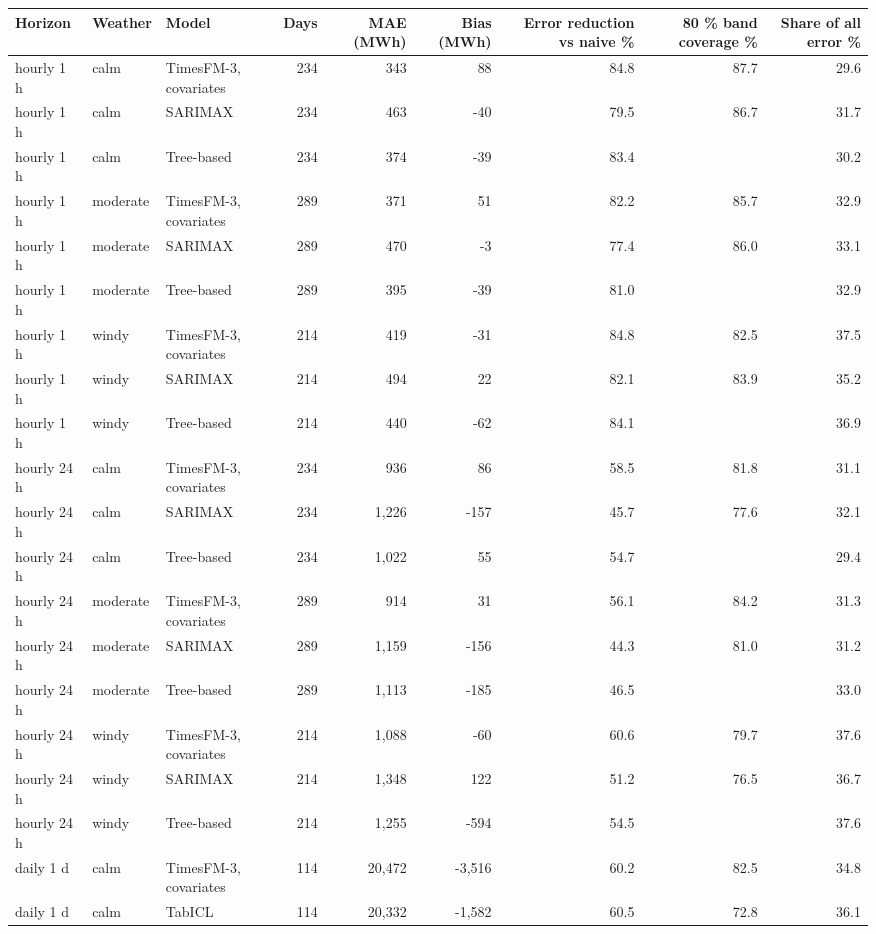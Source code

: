 \begin{tabular}{lllrrrrrr}
\toprule
Horizon & Weather & Model & Days & MAE (MWh) & Bias (MWh) & Error reduction vs naive \% & 80 \% band coverage \% & Share of all error \% \\
\midrule
hourly 1 h & calm & TimesFM-3, covariates & 234 & 343 & 88 & 84.8 & 87.7 & 29.6 \\
hourly 1 h & calm & SARIMAX & 234 & 463 & -40 & 79.5 & 86.7 & 31.7 \\
hourly 1 h & calm & Tree-based & 234 & 374 & -39 & 83.4 &  & 30.2 \\
hourly 1 h & moderate & TimesFM-3, covariates & 289 & 371 & 51 & 82.2 & 85.7 & 32.9 \\
hourly 1 h & moderate & SARIMAX & 289 & 470 & -3 & 77.4 & 86.0 & 33.1 \\
hourly 1 h & moderate & Tree-based & 289 & 395 & -39 & 81.0 &  & 32.9 \\
hourly 1 h & windy & TimesFM-3, covariates & 214 & 419 & -31 & 84.8 & 82.5 & 37.5 \\
hourly 1 h & windy & SARIMAX & 214 & 494 & 22 & 82.1 & 83.9 & 35.2 \\
hourly 1 h & windy & Tree-based & 214 & 440 & -62 & 84.1 &  & 36.9 \\
hourly 24 h & calm & TimesFM-3, covariates & 234 & 936 & 86 & 58.5 & 81.8 & 31.1 \\
hourly 24 h & calm & SARIMAX & 234 & 1,226 & -157 & 45.7 & 77.6 & 32.1 \\
hourly 24 h & calm & Tree-based & 234 & 1,022 & 55 & 54.7 &  & 29.4 \\
hourly 24 h & moderate & TimesFM-3, covariates & 289 & 914 & 31 & 56.1 & 84.2 & 31.3 \\
hourly 24 h & moderate & SARIMAX & 289 & 1,159 & -156 & 44.3 & 81.0 & 31.2 \\
hourly 24 h & moderate & Tree-based & 289 & 1,113 & -185 & 46.5 &  & 33.0 \\
hourly 24 h & windy & TimesFM-3, covariates & 214 & 1,088 & -60 & 60.6 & 79.7 & 37.6 \\
hourly 24 h & windy & SARIMAX & 214 & 1,348 & 122 & 51.2 & 76.5 & 36.7 \\
hourly 24 h & windy & Tree-based & 214 & 1,255 & -594 & 54.5 &  & 37.6 \\
daily 1 d & calm & TimesFM-3, covariates & 114 & 20,472 & -3,516 & 60.2 & 82.5 & 34.8 \\
daily 1 d & calm & TabICL & 114 & 20,332 & -1,582 & 60.5 & 72.8 & 36.1 \\

\end{tabular}
